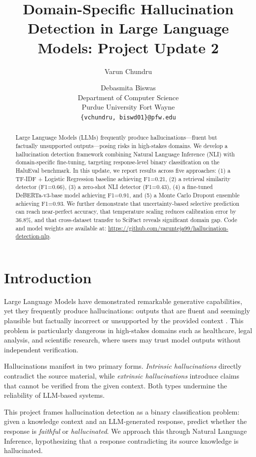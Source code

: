 \documentclass[11pt]{article}
\title{Domain-Specific Hallucination Detection in Large Language Models: Project Update 2}
\author{Varun Chundru \and Debasmita Biswas \\
  Department of Computer Science \\
  Purdue University Fort Wayne \\
  \texttt{\{vchundru, biswd01\}@pfw.edu}}
\begin{document}
\maketitle

\begin{abstract}
Large Language Models (LLMs) frequently produce hallucinations---fluent but factually unsupported outputs---posing risks in high-stakes domains. We develop a hallucination detection framework combining Natural Language Inference (NLI) with domain-specific fine-tuning, targeting response-level binary classification on the HaluEval benchmark. In this update, we report results across five approaches: (1) a TF-IDF + Logistic Regression baseline achieving F1=0.21, (2) a retrieval similarity detector (F1=0.66), (3) a zero-shot NLI detector (F1=0.43), (4) a fine-tuned DeBERTa-v3-base model achieving F1=0.91, and (5) a Monte Carlo Dropout ensemble achieving F1=0.93. We further demonstrate that uncertainty-based selective prediction can reach near-perfect accuracy, that temperature scaling reduces calibration error by 36.8\%, and that cross-dataset transfer to SciFact reveals significant domain gap. Code and model weights are available at: \url{https://github.com/varunteja99/hallucination-detection-nlp}.
\end{abstract}

\section{Introduction}

Large Language Models have demonstrated remarkable generative capabilities, yet they frequently produce hallucinations: outputs that are fluent and seemingly plausible but factually incorrect or unsupported by the provided context \cite{ji2023survey}. This problem is particularly dangerous in high-stakes domains such as healthcare, legal analysis, and scientific research, where users may trust model outputs without independent verification.

Hallucinations manifest in two primary forms. \textit{Intrinsic hallucinations} directly contradict the source material, while \textit{extrinsic hallucinations} introduce claims that cannot be verified from the given context. Both types undermine the reliability of LLM-based systems.

This project frames hallucination detection as a binary classification problem: given a knowledge context and an LLM-generated response, predict whether the response is \textit{faithful} or \textit{hallucinated}. We approach this through Natural Language Inference, hypothesizing that a response contradicting its source knowledge is hallucinated.
\end{document}
